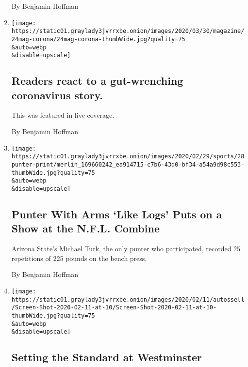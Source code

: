 \begin{enumerate}
  By Benjamin Hoffman
\item
  \href{/live/2020/coronavirus-usa-live-03-25/readers-react-to-a-gut-wrenching-coronavirus-story}{}

  \texttt{[image: https://static01.graylady3jvrrxbe.onion/images/2020/03/30/magazine/24mag-corona/24mag-corona-thumbWide.jpg?quality=75\\\&auto=webp\\\&disable=upscale]}

  \hypertarget{readers-react-to-a-gut-wrenching-coronavirus-story}{%
  \subsection{Readers react to a gut-wrenching coronavirus
  story.}\label{readers-react-to-a-gut-wrenching-coronavirus-story}}

  This was featured in live coverage.

  By Benjamin Hoffman
\item
  \href{/2020/02/28/sports/football/punter-combine-bench-press-michael-turk.html}{}

  \texttt{[image: https://static01.graylady3jvrrxbe.onion/images/2020/02/29/sports/28punter-print/merlin\_169660242\_ea914715-c7b6-43d0-bf34-a54a9d98c553-thumbWide.jpg?quality=75\\\&auto=webp\\\&disable=upscale]}

  \hypertarget{punter-with-arms-like-logs-puts-on-a-show-at-the-nfl-combine}{%
  \subsection{Punter With Arms `Like Logs' Puts on a Show at the N.F.L.
  Combine}\label{punter-with-arms-like-logs-puts-on-a-show-at-the-nfl-combine}}

  Arizona State's Michael Turk, the only punter who participated,
  recorded 25 repetitions of 225 pounds on the bench press.

  By Benjamin Hoffman
\item
  \href{/interactive/2020/02/12/sports/westminster-dog-show-winner.html}{}

  \texttt{[image: https://static01.graylady3jvrrxbe.onion/images/2020/02/11/autossell/Screen-Shot-2020-02-11-at-10/Screen-Shot-2020-02-11-at-10-thumbWide.jpg?quality=75\\\&auto=webp\\\&disable=upscale]}

  \hypertarget{setting-the-standard-at-westminster}{%
  \subsection{Setting the Standard at
  Westminster}\label{setting-the-standard-at-westminster}}


\end{enumerate}
